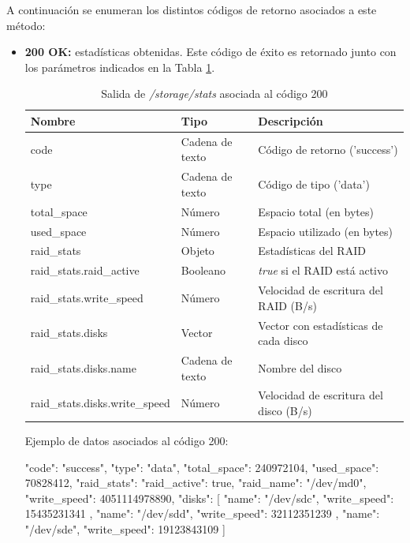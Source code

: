 A continuación se enumeran los distintos códigos de retorno asociados a este método:
\begin{itemize}

\item{\textbf{200 OK:} estadísticas obtenidas. Este código de éxito es retornado junto con los parámetros indicados en la Tabla \ref{extra:api:storagestats:ok}.
\begin{table}[H]
\centering
\begin{tabular}{|l|l|l|}
\hline
\rowcolor[HTML]{F5F5F5}
\textbf{Nombre}                & \textbf{Tipo}   & \textbf{Descripción}                        \\ \hline
code                           & Cadena de texto & Código de retorno ('success')               \\ \hline
type                           & Cadena de texto & Código de tipo ('data')                     \\ \hline
total\_space                   & Número          & Espacio total (en bytes)                    \\ \hline
used\_space                    & Número          & Espacio utilizado (en bytes)                \\ \hline
raid\_stats                    & Objeto          & Estadísticas del \gls{RAID}                 \\ \hline
raid\_stats.raid\_active       & Booleano        & \textit{true} si el \gls{RAID} está activo  \\ \hline
raid\_stats.write\_speed       & Número          & Velocidad de escritura del \gls{RAID} (B/s) \\ \hline
raid\_stats.disks              & Vector          & Vector con estadísticas de cada disco       \\ \hline
raid\_stats.disks.name         & Cadena de texto & Nombre del disco                            \\ \hline
raid\_stats.disks.write\_speed & Número          & Velocidad de escritura del disco (B/s)      \\ \hline
\end{tabular}
\caption{Salida de \textit{/storage/stats} asociada al código 200}
\label{extra:api:storagestats:ok}
\end{table}
\begin{minipage}{\textwidth}
Ejemplo de datos asociados al código 200:

\begin{code}[language=json]
{
  "code": "success",
  "type": "data",
  "total_space": 240972104,
  "used_space": 70828412,
  "raid_stats": {
    "raid_active": true,
    "raid_name": "/dev/md0",
    "write_speed": 4051114978890,
    "disks": [
      {
        "name": "/dev/sdc",
        "write_speed": 15435231341
      },
      {
        "name": "/dev/sdd",
        "write_speed": 32112351239
      },
      {
        "name": "/dev/sde",
        "write_speed": 19123843109
      }
    ]
  }
}
\end{code}
\end{minipage}
}

\end{itemize}


